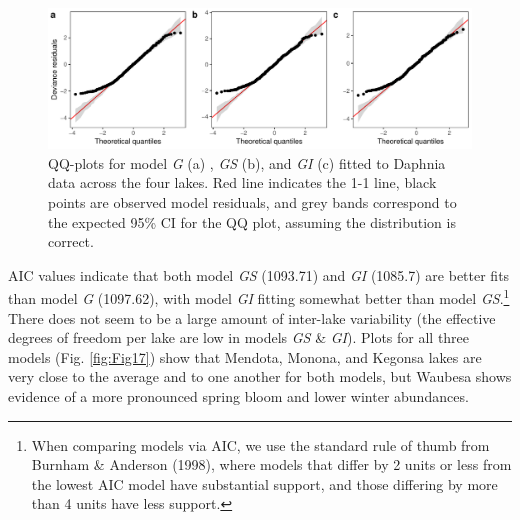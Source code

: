 \documentclass[12pt]{article}
\let\rmarkdownfootnote\footnote%
\def\footnote{\protect\rmarkdownfootnote}
\begin{document}
\begin{figure}
\centering
\includegraphics{../figures/Fig16.pdf}
\caption{\label{fig:Fig16} QQ-plots for model \emph{G} (a) , \emph{GS}
(b), and \emph{GI} (c) fitted to Daphnia data across the four lakes. Red
line indicates the 1-1 line, black points are observed model residuals,
and grey bands correspond to the expected 95\% CI for the QQ plot,
assuming the distribution is correct.}
\end{figure}

AIC values indicate that both model \emph{GS} (1093.71) and \emph{GI}
(1085.7) are better fits than model \emph{G} (1097.62), with model
\emph{GI} fitting somewhat better than model \emph{GS}.\footnote{When
  comparing models via AIC, we use the standard rule of thumb from
  Burnham \& Anderson (1998), where models that differ by 2 units or
  less from the lowest AIC model have substantial support, and those
  differing by more than 4 units have less support.} There does not seem
to be a large amount of inter-lake variability (the effective degrees of
freedom per lake are low in models \emph{GS} \& \emph{GI}). Plots for
all three models (Fig. \ref{fig:Fig17}) show that Mendota, Monona, and
Kegonsa lakes are very close to the average and to one another for both
models, but Waubesa shows evidence of a more pronounced spring bloom and
lower winter abundances.
\end{document}
